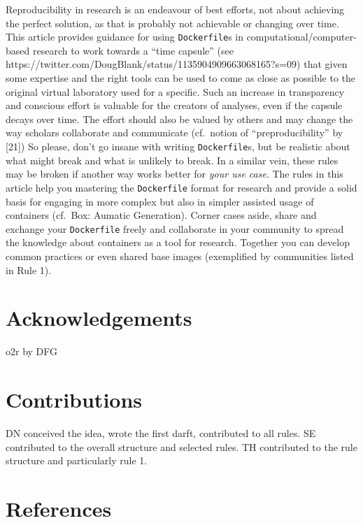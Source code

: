 \documentclass[10pt,letterpaper]{article}
\begin{document}
Reproducibility in research is an endeavour of best efforts, not about
achieving the perfect solution, as that is probably not achievable or
changing over time. This article provides guidance for using
\texttt{Dockerfile}s in computational/computer-based research to work
towards a ``time capsule'' (see
https://twitter.com/DougBlank/status/1135904909663068165?s=09) that
given some expertise and the right tools can be used to come as close as
possible to the original virtual laboratory used for a specific. Such an
increase in transparency and conscious effort is valuable for the
creators of analyses, even if the capsule decays over time. The effort
should also be valued by others and may change the way scholars
collaborate and communicate (cf.~notion of ``preproducibility'' by
{[}21{]}) So please, don't go insane with writing \texttt{Dockerfile}s,
but be realistic about what might break and what is unlikely to break.
In a similar vein, these rules may be broken if another way works better
for \emph{your use case}. The rules in this article help you mastering
the \texttt{Dockerfile} format for research and provide a solid basis
for engaging in more complex but also in simpler assisted usage of
containers (cf.~Box: Aumatic Generation). Corner cases aside, share and
exchange your \texttt{Dockerfile} freely and collaborate in your
community to spread the knowledge about containers as a tool for
research. Together you can develop common practices or even shared base
images (exemplified by communities listed in Rule 1).

\hypertarget{acknowledgements}{%
\section*{Acknowledgements}\label{acknowledgements}}

o2r by DFG

\hypertarget{contributions}{%
\section*{Contributions}\label{contributions}}

DN conceived the idea, wrote the first darft, contributed to all rules.
SE contributed to the overall structure and selected rules. TH
contributed to the rule structure and particularly rule 1.

\hypertarget{references}{%
\section*{References}\label{references}}
\end{document}
